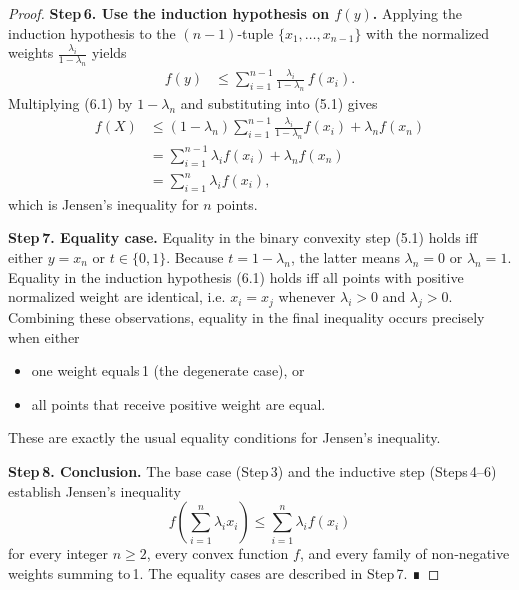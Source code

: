 \begin{proof}
\textbf{Step 6. Use the induction hypothesis on \(f(y)\).}  
Applying the induction hypothesis to the \((n-1)\)-tuple \(\{x_{1},\dots ,x_{n-1}\}\) with the normalized weights \(\frac{\lambda_{i}}{1-\lambda_{n}}\) yields
\begin{align*}
f(y)&\le\sum_{i=1}^{n-1}\frac{\lambda_{i}}{1-\lambda_{n}}\,f(x_{i}). \tag{6.1}
\end{align*}
Multiplying (6.1) by \(1-\lambda_{n}\) and substituting into (5.1) gives
\begin{align*}
f(X)&\le (1-\lambda_{n})\sum_{i=1}^{n-1}\frac{\lambda_{i}}{1-\lambda_{n}}f(x_{i})+\lambda_{n}f(x_{n})\\
&=\sum_{i=1}^{n-1}\lambda_{i}f(x_{i})+\lambda_{n}f(x_{n})\\
&=\sum_{i=1}^{n}\lambda_{i}f(x_{i}),
\end{align*}
which is Jensen’s inequality for \(n\) points.

\textbf{Step 7. Equality case.}  
Equality in the binary convexity step (5.1) holds iff either \(y=x_{n}\) or \(t\in\{0,1\}\).  Because \(t=1-\lambda_{n}\), the latter means \(\lambda_{n}=0\) or \(\lambda_{n}=1\).  
Equality in the induction hypothesis (6.1) holds iff all points with positive normalized weight are identical, i.e. \(x_{i}=x_{j}\) whenever \(\lambda_{i}>0\) and \(\lambda_{j}>0\).  
Combining these observations, equality in the final inequality occurs precisely when either

\begin{itemize}
\item one weight equals 1 (the degenerate case), or
\item all points that receive positive weight are equal.
\end{itemize}
These are exactly the usual equality conditions for Jensen’s inequality.

\textbf{Step 8. Conclusion.}  
The base case (Step 3) and the inductive step (Steps 4–6) establish Jensen’s inequality
\[
f\!\left(\sum_{i=1}^{n}\lambda_{i}x_{i}\right)\le \sum_{i=1}^{n}\lambda_{i}f(x_{i})
\]
for every integer \(n\ge 2\), every convex function \(f\), and every family of non‑negative weights summing to 1.  
The equality cases are described in Step 7.  ∎
\end{proof}
